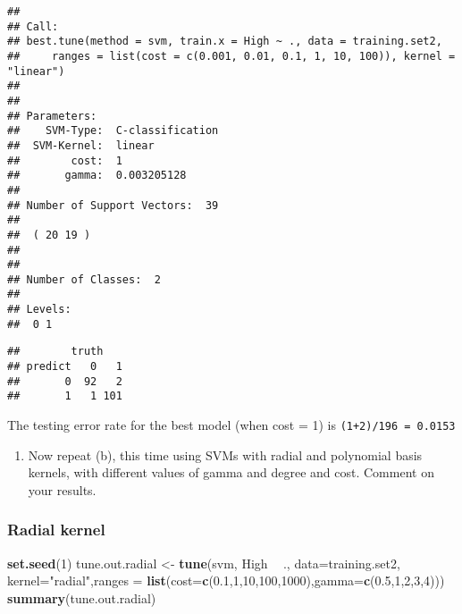 \documentclass[]{article}
\newenvironment{Shaded}{\begin{snugshade}}{\end{snugshade}}
\newcommand{\KeywordTok}[1]{\textcolor[rgb]{0.13,0.29,0.53}{\textbf{#1}}}
\newcommand{\DataTypeTok}[1]{\textcolor[rgb]{0.13,0.29,0.53}{#1}}
\newcommand{\DecValTok}[1]{\textcolor[rgb]{0.00,0.00,0.81}{#1}}
\newcommand{\FloatTok}[1]{\textcolor[rgb]{0.00,0.00,0.81}{#1}}
\newcommand{\StringTok}[1]{\textcolor[rgb]{0.31,0.60,0.02}{#1}}
\newcommand{\OperatorTok}[1]{\textcolor[rgb]{0.81,0.36,0.00}{\textbf{#1}}}
\newcommand{\NormalTok}[1]{#1}
\providecommand{\tightlist}{%
  \setlength{\itemsep}{0pt}\setlength{\parskip}{0pt}}
\begin{document}
\begin{verbatim}
## 
## Call:
## best.tune(method = svm, train.x = High ~ ., data = training.set2, 
##     ranges = list(cost = c(0.001, 0.01, 0.1, 1, 10, 100)), kernel = "linear")
## 
## 
## Parameters:
##    SVM-Type:  C-classification 
##  SVM-Kernel:  linear 
##        cost:  1 
##       gamma:  0.003205128 
## 
## Number of Support Vectors:  39
## 
##  ( 20 19 )
## 
## 
## Number of Classes:  2 
## 
## Levels: 
##  0 1
\end{verbatim}

\begin{Shaded}
\end{Shaded}

\begin{verbatim}
##        truth
## predict   0   1
##       0  92   2
##       1   1 101
\end{verbatim}

The testing error rate for the best model (when cost = 1) is
\texttt{(1+2)/196\ =\ 0.0153}

\begin{enumerate}
\def\labelenumi{(\alph{enumi})}
\setcounter{enumi}{2}
\tightlist
\item
  Now repeat (b), this time using SVMs with radial and polynomial basis
  kernels, with different values of gamma and degree and cost. Comment
  on your results.
\end{enumerate}

\subsubsection{Radial kernel}\label{radial-kernel}

\begin{Shaded}
\begin{Highlighting}[]
\KeywordTok{set.seed}\NormalTok{(}\DecValTok{1}\NormalTok{)}
\NormalTok{tune.out.radial <-}\StringTok{ }\KeywordTok{tune}\NormalTok{(svm, High }\OperatorTok{~}\StringTok{ }\NormalTok{., }\DataTypeTok{data=}\NormalTok{training.set2, }\DataTypeTok{kernel=}\StringTok{"radial"}\NormalTok{,}\DataTypeTok{ranges =} \KeywordTok{list}\NormalTok{(}\DataTypeTok{cost=}\KeywordTok{c}\NormalTok{(}\FloatTok{0.1}\NormalTok{,}\DecValTok{1}\NormalTok{,}\DecValTok{10}\NormalTok{,}\DecValTok{100}\NormalTok{,}\DecValTok{1000}\NormalTok{),}\DataTypeTok{gamma=}\KeywordTok{c}\NormalTok{(}\FloatTok{0.5}\NormalTok{,}\DecValTok{1}\NormalTok{,}\DecValTok{2}\NormalTok{,}\DecValTok{3}\NormalTok{,}\DecValTok{4}\NormalTok{)))}
\KeywordTok{summary}\NormalTok{(tune.out.radial)}
\end{Highlighting}
\end{Shaded}
\end{document}
